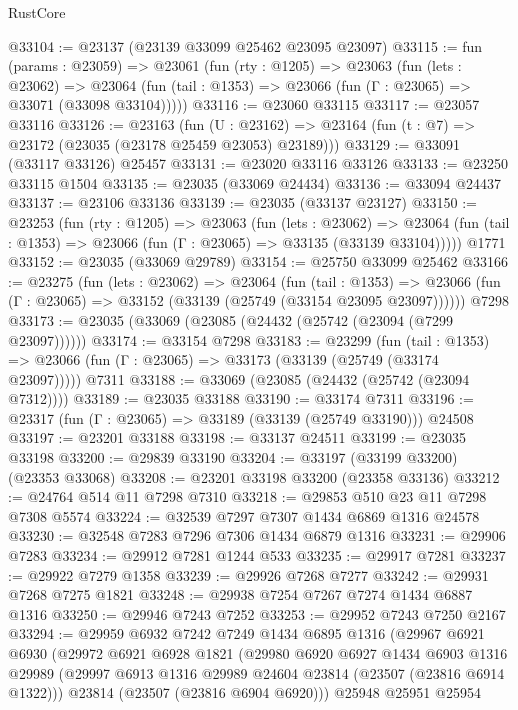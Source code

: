 \begin{lexlean}{RustCore}
\begin{coremodule}
@33104 := @23137 (@23139 @33099 @25462 @23095 @23097)
@33115 := fun (params : @23059) =>
  @23061
    (fun (rty : @1205) =>
    @23063
      (fun (lets : @23062) =>
      @23064 (fun (tail : @1353) => @23066 (fun (Γ : @23065) => @33071 (@33098 @33104)))))
@33116 := @23060 @33115
@33117 := @23057 @33116
@33126 := @23163
    (fun (U : @23162) => @23164 (fun (t : @7) => @23172 (@23035 (@23178 @25459 @23053) @23189)))
@33129 := @33091 (@33117 @33126) @25457
@33131 := @23020 @33116 @33126
@33133 := @23250 @33115 @1504
@33135 := @23035 (@33069 @24434)
@33136 := @33094 @24437
@33137 := @23106 @33136
@33139 := @23035 (@33137 @23127)
@33150 := @23253
    (fun (rty : @1205) =>
    @23063
      (fun (lets : @23062) =>
      @23064 (fun (tail : @1353) => @23066 (fun (Γ : @23065) => @33135 (@33139 @33104)))))
    @1771
@33152 := @23035 (@33069 @29789)
@33154 := @25750 @33099 @25462
@33166 := @23275
    (fun (lets : @23062) =>
    @23064
      (fun (tail : @1353) =>
      @23066 (fun (Γ : @23065) => @33152 (@33139 (@25749 (@33154 @23095 @23097))))))
    @7298
@33173 := @23035 (@33069 (@23085 (@24432 (@25742 (@23094 (@7299 @23097))))))
@33174 := @33154 @7298
@33183 := @23299
    (fun (tail : @1353) => @23066 (fun (Γ : @23065) => @33173 (@33139 (@25749 (@33174 @23097)))))
    @7311
@33188 := @33069 (@23085 (@24432 (@25742 (@23094 @7312))))
@33189 := @23035 @33188
@33190 := @33174 @7311
@33196 := @23317 (fun (Γ : @23065) => @33189 (@33139 (@25749 @33190))) @24508
@33197 := @23201 @33188
@33198 := @33137 @24511
@33199 := @23035 @33198
@33200 := @29839 @33190
@33204 := @33197 (@33199 @33200) (@23353 @33068)
@33208 := @23201 @33198 @33200 (@23358 @33136)
@33212 := @24764 @514 @11 @7298 @7310
@33218 := @29853 @510 @23 @11 @7298 @7308 @5574
@33224 := @32539 @7297 @7307 @1434 @6869 @1316 @24578
@33230 := @32548 @7283 @7296 @7306 @1434 @6879 @1316
@33231 := @29906 @7283
@33234 := @29912 @7281 @1244 @533
@33235 := @29917 @7281
@33237 := @29922 @7279 @1358
@33239 := @29926 @7268 @7277
@33242 := @29931 @7268 @7275 @1821
@33248 := @29938 @7254 @7267 @7274 @1434 @6887 @1316
@33250 := @29946 @7243 @7252
@33253 := @29952 @7243 @7250 @2167
@33294 := @29959
    @6932
    @7242
    @7249
    @1434
    @6895
    @1316
    (@29967
      @6921
      @6930
      (@29972
        @6921
        @6928
        @1821
        (@29980
          @6920
          @6927
          @1434
          @6903
          @1316
          @29989
          (@29997 @6913 @1316 @29989 @24604 @23814 (@23507 (@23816 @6914 @1322)))
          @23814
          (@23507 (@23816 @6904 @6920)))
        @25948
        @25951
        @25954

\end{coremodule}
\end{lexlean}
